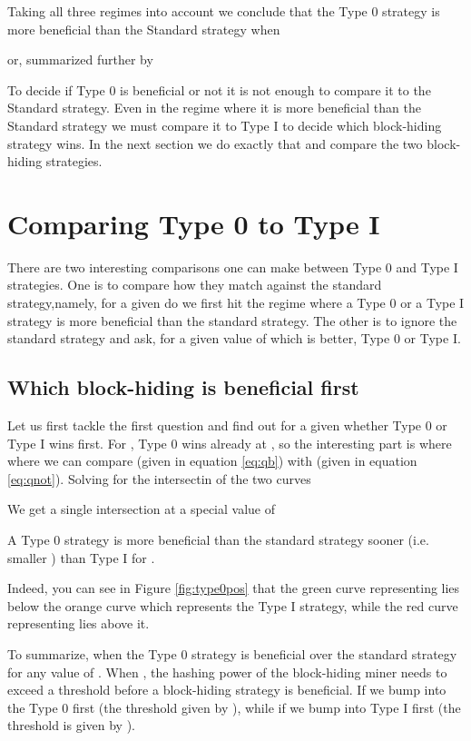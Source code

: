 \documentclass[letterpaper,12pt]{report}
\begin{document}
Taking all three regimes into account we conclude that the Type 0 strategy is more beneficial than the Standard strategy when



or, summarized further by 



To decide if Type 0 is beneficial or not it is not enough to compare it to the Standard strategy. Even in the regime where it is more beneficial than the Standard strategy we must compare it to Type I to decide which block-hiding strategy wins. In the next section we do exactly that and compare the two block-hiding strategies.

\section{Comparing Type 0 to Type I}

There are two interesting comparisons one can make between Type 0 and Type I strategies.
One is to compare how they match against the standard strategy,namely, for a given  do we first hit the regime where a Type 0 or a Type I strategy is more beneficial than the standard strategy.
The other is to ignore the standard strategy and ask, for a given value of  which is better, Type 0 or Type I.

\subsection{Which block-hiding is beneficial first}
Let us first tackle the first question and find out for a given  whether Type 0 or Type I wins first.
For , Type 0 wins already at , so the interesting part is where  where we can compare  (given in equation \ref{eq:qb}) with  (given in equation \ref{eq:qnot}). Solving for the intersectin of the two curves



We get a single intersection at a special value of 



A Type 0 strategy is more beneficial than the standard strategy sooner (i.e. smaller ) than Type I for .

Indeed, you can see in Figure \ref{fig:type0pos} that the green curve representing  lies below the orange curve which represents the Type I strategy, while the red curve representing  lies above it.

To summarize, when  the Type 0 strategy is beneficial over the standard strategy for any value of . When  , the hashing power of the block-hiding miner needs to exceed a threshold before a block-hiding strategy is beneficial. If  we bump into the Type 0 first (the threshold given by ), while if  we bump into Type I first (the threshold is given by ).
\end{document}

